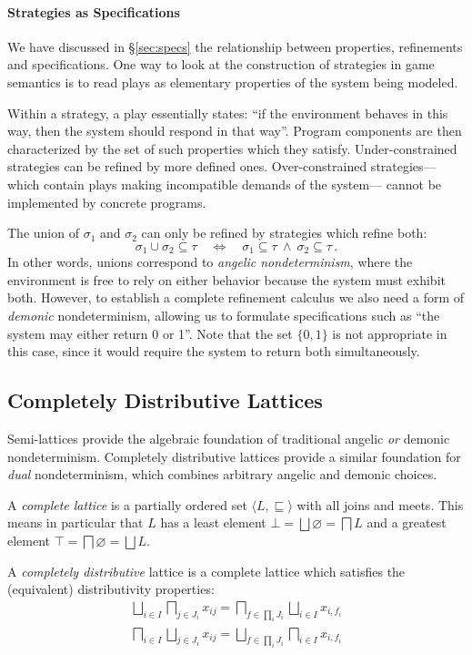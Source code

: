 \documentclass[sigplan,10pt,review,anonymous]{acmart}
\begin{document}
\paragraph{Strategies as Specifications}

We have discussed in \S\ref{sec:specs}
the relationship between
properties, refinements and specifications.
One way to look at the construction of strategies
in game semantics
is to read plays as elementary properties
of the system being modeled.

Within a strategy,
a play essentially states:
``if the environment behaves in this way,
then the system should respond in that way''.
Program components are then characterized by
the set of such properties which they satisfy.
Under-constrained strategies can be refined by
more defined ones.
Over-constrained strategies---%
which contain plays
making incompatible demands of the system---%
cannot be implemented by concrete programs.

The union of $\sigma_1$ and $\sigma_2$
can only be refined by strategies which refine both:
\[
  \sigma_1 \cup \sigma_2 \subseteq \tau
  \quad\Leftrightarrow\quad
  \sigma_1 \subseteq \tau \:\wedge\:
  \sigma_2 \subseteq \tau
  \,.
\]
In other words,
unions correspond to \emph{angelic nondeterminism},
where the environment is free to rely on either behavior
because the system must exhibit both.
However,
to establish a complete refinement calculus
we also need a form of \emph{demonic} nondeterminism,
allowing us to formulate specifications such as
``the system may either return 0 or 1''.
Note that the set $\{0, 1\}$ is not appropriate in this case,
since it would require the system to return both
simultaneously.


\subsection{Completely Distributive Lattices} %

Semi-lattices provide the algebraic foundation
of traditional angelic \emph{or} demonic nondeterminism.
Completely distributive lattices
provide a similar foundation for
\emph{dual} nondeterminism,
which combines arbitrary angelic and demonic choices.

\begin{definition}
A \emph{complete lattice}
is a partially ordered set $\langle L, {\sqsubseteq} \rangle$
with all joins and meets.
This means in particular that $L$
has a least element $\bot = \bigsqcup \varnothing = \bigsqcap L$
and a greatest element $\top = \bigsqcap \varnothing = \bigsqcup L$.

A \emph{completely distributive} lattice
is a complete lattice which satisfies
the (equivalent) distributivity properties:
\begin{gather} \label{eqn:compdist}
  \bigsqcup_{i \in I} \bigsqcap_{j \in J_i} x_{ij} =
  \bigsqcap_{f \in \prod_i J_i} \bigsqcup_{i \in I} x_{i,f_i}
  \\
  \bigsqcap_{i \in I} \bigsqcup_{j \in J_i} x_{ij} =
  \bigsqcup_{f \in \prod_i J_i} \bigsqcap_{i \in I} x_{i,f_i}
\end{gather}
\end{definition}
\end{document}
